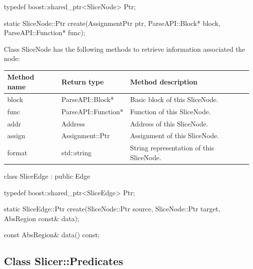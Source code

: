 \begin{apient}
typedef boost::shared_ptr<SliceNode> Ptr;

static SliceNode::Ptr create(AssignmentPtr ptr,
                             ParseAPI::Block* block,
                             ParseAPI::Function* func);
\end{apient}

Class SliceNode has the following methods to retrieve information associated the
node:

\begin{tabularx}{\textwidth}{llX}
\toprule
Method name & Return type & Method description \\
\midrule
block & ParseAPI::Block* & Basic block of this SliceNode. \\
func & ParseAPI::Function* & Function of this SliceNode. \\
addr & Address & Address of this SliceNode. \\
assign & Assignment::Ptr & Assignment of this SliceNode. \\
format & std::string & String representation of this SliceNode.\\
\bottomrule
\end{tabularx}


\begin{apient}
class SliceEdge : public Edge
\end{apient}

\begin{apient}
typedef boost::shared_ptr<SliceEdge> Ptr;

static SliceEdge::Ptr create(SliceNode::Ptr source,
                             SliceNode::Ptr target,
                             AbsRegion const& data);
\end{apient}

\begin{apient}
const AbsRegion& data() const;
\end{apient}


\subsection{Class Slicer::Predicates}
\label{sec:slicer-predicates}

